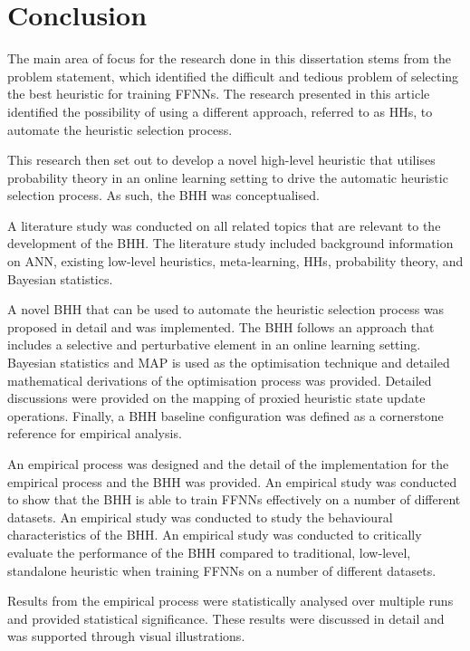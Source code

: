 \section{Conclusion}
\label{sec:conclusion}

The main area of focus for the research done in this dissertation stems from the problem statement, which identified the difficult and tedious problem of selecting the best heuristic for training \acp{FFNN}. The research presented in this article identified the possibility of using a different approach, referred to as \acp{HH}, to automate the heuristic selection process.

This research then set out to develop a novel high-level heuristic that utilises probability theory in an online learning setting to drive the automatic heuristic selection process. As such, the \acs{BHH} was conceptualised.

A literature study was conducted on all related topics that are relevant to the development of the \acs{BHH}. The literature study included background information on \acs{ANN}, existing low-level heuristics, meta-learning, \acp{HH}, probability theory, and Bayesian statistics.

A novel \acs{BHH} that can be used to automate the heuristic selection process was proposed in detail and was implemented. The \acs{BHH} follows an approach that includes a selective and perturbative element in an online learning setting. Bayesian statistics and \acs{MAP} is used as the optimisation technique and detailed mathematical derivations of the optimisation process was provided. Detailed discussions were provided on the mapping of proxied heuristic state update operations. Finally, a \acs{BHH} baseline configuration was defined as a cornerstone reference for empirical analysis.

An empirical process was designed and the detail of the implementation for the empirical process and the \acs{BHH} was provided. An empirical study was conducted to show that the \ac{BHH} is able to train \acp{FFNN} effectively on a number of different datasets. An empirical study was conducted to study the behavioural characteristics of the \acs{BHH}. An empirical study was conducted to critically evaluate the performance of the \acs{BHH} compared to traditional, low-level, standalone heuristic when training \acp{FFNN} on a number of different datasets.

Results from the empirical process were statistically analysed over multiple runs and provided statistical significance. These results were discussed in detail and was supported through visual illustrations.

